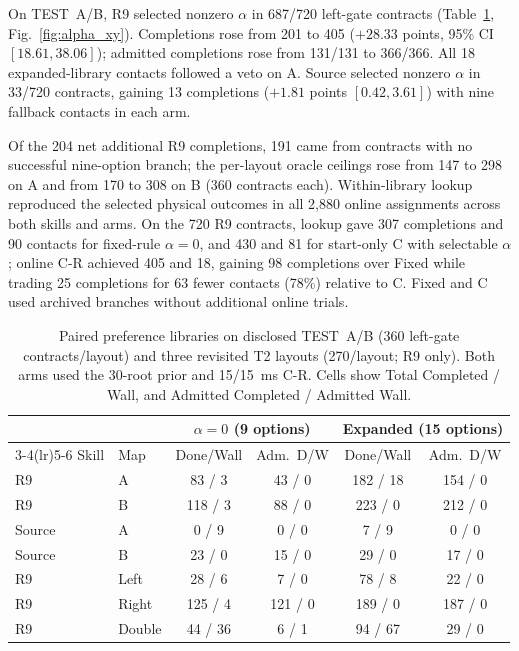 \documentclass[letterpaper,10pt,conference]{ieeeconf}
\begin{document}
On TEST~A/B, R9 selected nonzero $\alpha$ in 687/720 left-gate contracts (Table~\ref{tab:alpha_lib}, Fig.~\ref{fig:alpha_xy}). Completions rose from 201 to 405 ($+28.33$ points, 95\% CI $[18.61,38.06]$); admitted completions rose from 131/131 to 366/366. All 18 expanded-library contacts followed a veto on A. Source selected nonzero $\alpha$ in 33/720 contracts, gaining 13 completions ($+1.81$ points $[0.42,3.61]$) with nine fallback contacts in each arm.

Of the 204 net additional R9 completions, 191 came from contracts with no successful nine-option branch; the per-layout oracle ceilings rose from 147 to 298 on A and from 170 to 308 on B (360 contracts each). Within-library lookup reproduced the selected physical outcomes in all 2,880 online assignments across both skills and arms. On the 720 R9 contracts, lookup gave 307 completions and 90 contacts for fixed-rule $\alpha=0$, and 430 and 81 for start-only C with selectable $\alpha$; online C-R achieved 405 and 18, gaining 98 completions over Fixed while trading 25 completions for 63 fewer contacts (78\%) relative to C. Fixed and C used archived branches without additional online trials.

\begin{table}[t]\centering
\caption{Paired preference libraries on disclosed TEST~A/B (360 left-gate contracts/layout) and three revisited T2 layouts (270/layout; R9 only). Both arms used the 30-root prior and 15/15~ms C-R. Cells show Total Completed / Wall, and Admitted Completed / Admitted Wall.}
\scriptsize\setlength{\tabcolsep}{3pt}
\begin{tabular}{llcccc}\toprule
 & & \multicolumn{2}{c}{$\alpha=0$ (9 options)} & \multicolumn{2}{c}{Expanded (15 options)}\\\cmidrule(lr){3-4}\cmidrule(lr){5-6}
Skill & Map & Done/Wall & Adm.\ D/W & Done/Wall & Adm.\ D/W\\\midrule
R9 & A & 83 / 3 & 43 / 0 & 182 / 18 & 154 / 0\\
R9 & B & 118 / 3 & 88 / 0 & 223 / 0 & 212 / 0\\
Source & A & 0 / 9 & 0 / 0 & 7 / 9 & 0 / 0\\
Source & B & 23 / 0 & 15 / 0 & 29 / 0 & 17 / 0\\\midrule
R9 & Left & 28 / 6 & 7 / 0 & 78 / 8 & 22 / 0\\
R9 & Right & 125 / 4 & 121 / 0 & 189 / 0 & 187 / 0\\
R9 & Double & 44 / 36 & 6 / 1 & 94 / 67 & 29 / 0\\\bottomrule
\end{tabular}\label{tab:alpha_lib}
\end{table}
\end{document}
